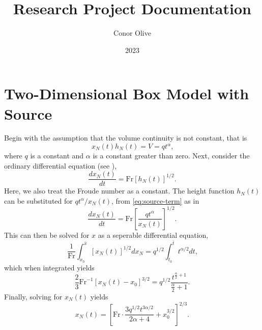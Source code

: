 \documentclass{report}
\title{Research Project Documentation}
\author{Conor Olive}
\date{2023}
\begin{document}
	\tableofcontents
	
	\section{Two-Dimensional Box Model with Source}
	Begin with the assumption that the volume continuity is not constant, that is 
	\begin{equation}\label{eq:source-term}
		x_N(t)h_N(t) = V = qt^{\alpha}\text{,}
	\end{equation}
	where \(q\) is a constant and \(\alpha\) is a constant greater than zero. Next, consider the ordinary differential equation (see \cite[60]{Ungarish2009}), 
	\begin{equation}\label{eq:box-model}
		\frac{dx_N(t)}{dt} = \text{Fr}\left[h_N(t)\right]^{1/2}\text{.}
	\end{equation}
	Here, we also treat the Froude number as a constant. The height function \(h_N(t)\) can be substituted for \(qt^{\alpha} / x_N(t)\), from \eqref{eq:source-term} as in
	\begin{equation*}
		\frac{dx_N(t)}{dt} = \text{Fr}\left[\frac{qt^{\alpha}}{x_N(t)}\right]^{1/2}\text{.}
	\end{equation*}
	This can then be solved for \(x\) as a seperable differential equation,
	\begin{equation*}
		\frac{1}{\text{Fr}}\int_{x_0}^{\bar{x}} \left[x_N(t)\right]^{1/2} dx_N = q^{1/2} \int_{t_0}^{\bar{t}} t^{\alpha/2} dt\text{,}
	\end{equation*}
	which when integrated yields
	\begin{equation*}
		\frac{2}{3}\text{Fr}^{-1}\left[x_N(t) - x_0\right]^{3/2} = q^{1/2}\frac{t^{\frac{\alpha}{2} +1}}{\frac{\alpha}{2} + 1}\text{.}
	\end{equation*}
	Finally, solving for \(x_N(t)\) yields
	\begin{equation*}
		x_N(t) = \left[\text{Fr}\cdot\frac{3q^{1/2}t^{3\alpha/2 }}{2\alpha + 4} + x_0^{3/2}\right]^{2/3}\text{.}
	\end{equation*}

	\printbibliography
\end{document}
